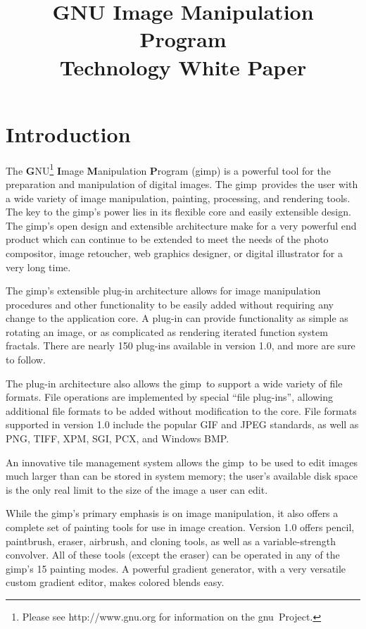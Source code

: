 \documentclass[12pt]{article}
\def\gimp{{\sc gimp}}
\def\gnu{{\sc gnu}}
\begin{document}
\title{GNU Image Manipulation Program\\
	Technology White Paper}
\date{}
\maketitle

\part{Introduction}

The {\bf G}NU\footnote{Please see http://www.gnu.org for information
on the \gnu\ Project.} {\bf I}mage {\bf M}anipulation {\bf P}rogram
(\gimp) is a powerful tool for the preparation and manipulation of
digital images.  The \gimp\ provides the user with a wide variety of
image manipulation, painting, processing, and rendering tools.  The
key to the \gimp's power lies in its flexible core and easily
extensible design.  The \gimp's open design and extensible
architecture make for a very powerful end product which can continue
to be extended to meet the needs of the photo compositor, image
retoucher, web graphics designer, or digital illustrator for a very
long time.

The \gimp's extensible plug-in architecture allows for image
manipulation procedures and other functionality to be easily added
without requiring any change to the application core.  A plug-in can
provide functionality as simple as rotating an image, or as
complicated as rendering iterated function system fractals.  There are
nearly 150 plug-ins available in version 1.0, and more are sure to
follow.

The plug-in architecture also allows the \gimp\ to support a wide
variety of file formats.  File operations are implemented by special
``file plug-ins'', allowing additional file formats to be added
without modification to the core.  File formats supported in version
1.0 include the popular GIF and JPEG standards, as well as PNG, TIFF,
XPM, SGI, PCX, and Windows BMP.

An innovative tile management system allows the \gimp\ to be used to
edit images much larger than can be stored in system memory; the
user's available disk space is the only real limit to the size of the
image a user can edit.

While the \gimp's primary emphasis is on image manipulation, it also
offers a complete set of painting tools for use in image creation.
Version 1.0 offers pencil, paintbrush, eraser, airbrush, and cloning
tools, as well as a variable-strength convolver.  All of these tools
(except the eraser) can be operated in any of the \gimp's 15 painting
modes.  A powerful gradient generator, with a very versatile custom
gradient editor, makes colored blends easy.
\end{document}
